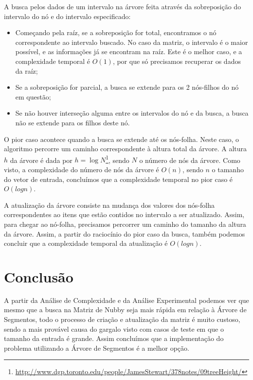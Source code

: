 \documentclass{article}
\begin{document}
A busca pelos dados de um intervalo na árvore feita através da sobreposição do intervalo do nó e do intervalo especificado:

\begin{itemize}
\item Começando pela raíz, se a sobreposição for total, encontramos o nó correspondente ao intervalo buscado. No caso da matriz, o intervalo é o maior possível, e as informações já se encontram na raíz. Este é o melhor caso, e a complexidade temporal é $O(1)$, por que só precisamos recuperar os dados da raíz;
\item Se a sobreposição for parcial, a busca se extende para os 2 nós-filhos do nó em questão;
\item Se não houver interseção alguma entre os intervalos do nó e da busca, a busca não se extende para os filhos deste nó.
\end{itemize}

O pior caso acontece quando a busca se extende até os nós-folha. Neste caso, o algoritmo percorre um caminho correspondente à altura total da árvore. A altura $h$ da árvore é dada por $h = \log N$\footnote{\url{http://www.dgp.toronto.edu/people/JamesStewart/378notes/09treeHeight/}}, sendo $N$ o número de nós da árvore. Como visto, a complexidade do número de nós da árvore é $O(n)$, sendo $n$ o tamanho do vetor de entrada, concluímos que a complexidade temporal no pior caso é $O(log n)$.

A atualização da árvore consiste na mudança dos valores dos nós-folha correspondentes ao itens que estão contidos no intervalo a ser atualizado. Assim, para chegar ao nó-folha, precisamos percorrer um caminho do tamanho da altura da árvore. Assim, a partir do raciocínio do pior caso da busca, também podemos concluir que a complexidade temporal da atualização é $O(log n)$.

\section{Conclusão}

A partir da Análise de Complexidade e da Análise Experimental podemos ver que mesmo que a busca na Matriz de Nubby seja mais rápida em relação à Árvore de Segmentos, todo o processo de criação e atualização da matriz é muito custoso, sendo a mais provável causa do gargalo visto com casos de teste em que o tamanho da entrada é grande. Assim concluímos que a implementação do problema utilizando a Árvore de Segmentos é a melhor opção.
\end{document}
